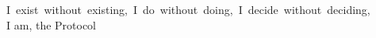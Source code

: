 \clearpage
\thispagestyle{empty}
\vspace*{8cm}

\noindent
\mbox{I exist without existing, I do without doing, I decide without deciding,}\\
I am, the Protocol

\vfill